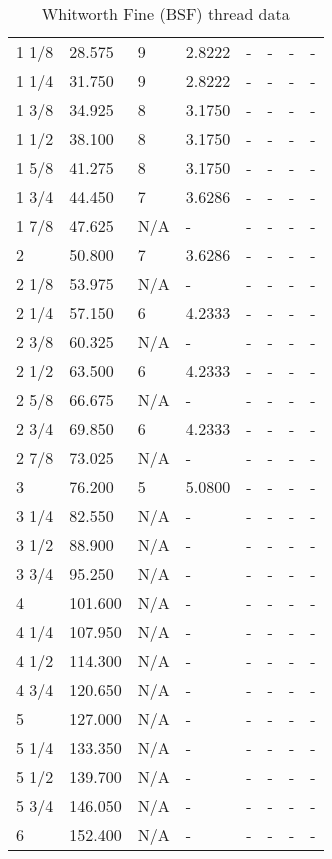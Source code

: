 \begin{table}[h!]
\begin{longtable}{ll|ll|llll}
1 1/8 &28.575  &9      &2.8222 &-      &-     &-    &-    \\
1 1/4 &31.750  &9      &2.8222 &-      &-     &-    &-    \\
1 3/8 &34.925  &8      &3.1750 &-      &-     &-    &-    \\
1 1/2 &38.100  &8      &3.1750 &-      &-     &-    &-    \\
1 5/8 &41.275  &8      &3.1750 &-      &-     &-    &-    \\
1 3/4 &44.450  &7      &3.6286 &-      &-     &-    &-    \\
1 7/8 &47.625  &N/A    &-      &-      &-     &-    &-    \\
2     &50.800  &7      &3.6286 &-      &-     &-    &-    \\
2 1/8 &53.975  &N/A    &-      &-      &-     &-    &-    \\
2 1/4 &57.150  &6      &4.2333 &-      &-     &-    &-    \\
2 3/8 &60.325  &N/A    &-      &-      &-     &-    &-    \\
2 1/2 &63.500  &6      &4.2333 &-      &-     &-    &-    \\
2 5/8 &66.675  &N/A    &-      &-      &-     &-    &-    \\
2 3/4 &69.850  &6      &4.2333 &-      &-     &-    &-    \\
2 7/8 &73.025  &N/A    &-      &-      &-     &-    &-    \\
3     &76.200  &5      &5.0800 &-      &-     &-    &-    \\
3 1/4 &82.550  &N/A    &-      &-      &-     &-    &-    \\
3 1/2 &88.900  &N/A    &-      &-      &-     &-    &-    \\
3 3/4 &95.250  &N/A    &-      &-      &-     &-    &-    \\
4     &101.600 &N/A    &-      &-      &-     &-    &-    \\
4 1/4 &107.950 &N/A    &-      &-      &-     &-    &-    \\
4 1/2 &114.300 &N/A    &-      &-      &-     &-    &-    \\
4 3/4 &120.650 &N/A    &-      &-      &-     &-    &-    \\
5     &127.000 &N/A    &-      &-      &-     &-    &-    \\
5 1/4 &133.350 &N/A    &-      &-      &-     &-    &-    \\
5 1/2 &139.700 &N/A    &-      &-      &-     &-    &-    \\
5 3/4 &146.050 &N/A    &-      &-      &-     &-    &-    \\
6     &152.400 &N/A    &-      &-      &-     &-    &-    \\
\end{longtable}
	\caption{Whitworth Fine (BSF) thread data}
\end{table}
\clearpage

